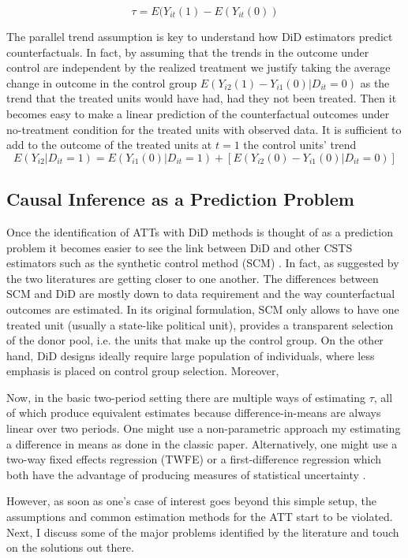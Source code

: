 \documentclass[hidelinks]{article}\usepackage[]{graphicx}\usepackage[]{color}
\begin{document}
$$ \tau = E(Y_{it}(1) - E(Y_{it}(0))$$

The parallel trend assumption is key to understand how DiD estimators predict counterfactuals. In fact, by assuming that the trends in the outcome under control are independent by the realized treatment we justify taking the average change in outcome in the control group $E(Y_{i2} (1) - Y_{i1}(0) | D_{it} = 0)$ as the trend that the treated units would have had, had they not been treated. Then it becomes easy to make a linear prediction of the counterfactual outcomes under no-treatment condition for the treated units with observed data. It is sufficient to add to the outcome of the treated units at $t=1$ the control units' trend
$$ E(Y_{i2} | D_{it} = 1) = E(Y_{i1}(0) | D_{it} = 1) + \left[ E(Y_{i2} (0) - Y_{i1}(0) | D_{it} = 0) \right] $$

\subsection{Causal Inference as a Prediction Problem}

Once the identification of ATTs with DiD methods is thought of as a prediction problem it becomes easier to see the link between DiD and other CSTS estimators such as the synthetic control method (SCM) \parencite{Abadie2010}. In fact, as suggested by \textcite{Roth2022} the two literatures are getting closer to one another. The differences between SCM and DiD are mostly down to data requirement and the way counterfactual outcomes are estimated. In its original formulation, SCM only allows to have one treated unit (usually a state-like political unit), provides a transparent selection of the donor pool, i.e. the units that make up the control group. On the other hand, DiD designs ideally require large population of individuals, where less emphasis is placed on control group selection. Moreover,

Now, in the basic two-period setting there are multiple ways of estimating $\tau$, all of which produce equivalent estimates because difference-in-means are always linear over two periods. One might use a non-parametric approach my estimating a difference in means as done in the classic \textcite{Card1990} paper. Alternatively, one might use a two-way fixed effects regression (TWFE) or a first-difference regression which both have the advantage of producing measures of statistical uncertainty \parencite{Angrist2009}.

However, as soon as one's case of interest goes beyond this simple setup, the assumptions and common estimation methods for the ATT start to be violated. Next, I discuss some of the major problems identified by the literature and touch on the solutions out there.
\end{document}
